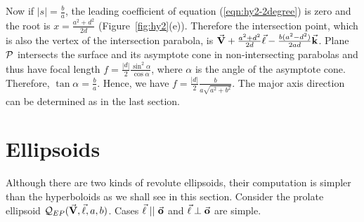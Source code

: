      Now if $|s|=\frac{b}{a}$, the leading coefficient of equation
(\ref{eqn:hy2-2degree}) is zero and the root is $x=\frac{a^2+d^2}{2d}$
(Figure~\ref{fig:hy2}(e)).  Therefore the intersection point, which is also
the vertex of the intersection parabola, is
$\vec{\bf V}+\frac{a^2+d^2}{2d}\vec{\bf \ell}-\frac{b(a^2-d^2)}{2ad}\vec{\bf k}$.
Plane ${\cal P}$ intersects the surface and its asymptote cone in
non-intersecting parabolas and thus have focal length
$f=\frac{|d|}{2}\frac{\sin^2\alpha}{\cos\alpha}$, where $\alpha$ is the
angle of the asymptote cone.  Therefore, $\tan\alpha=\frac{b}{a}$.  Hence, we
have $f=\frac{|d|}{2}\frac{b}{a\sqrt{a^2+b^2}}$.  The major axis direction
can be determined as in the last section.  \QED


\section{Ellipsoids}
\label{section:ellipsoid}

     Although there are two kinds of revolute ellipsoids, their computation is
simpler than the hyperboloids as we shall see in this section.  Consider
the prolate ellipsoid ${\cal Q}_{EP}(\vec{\bf V},\vec{\bf \ell},a,b)$.  Cases
$\vec{\bf \ell}\ ||\ \vec{\bf o}$ and $\vec{\bf \ell}\perp\vec{\bf o}$ are simple.

